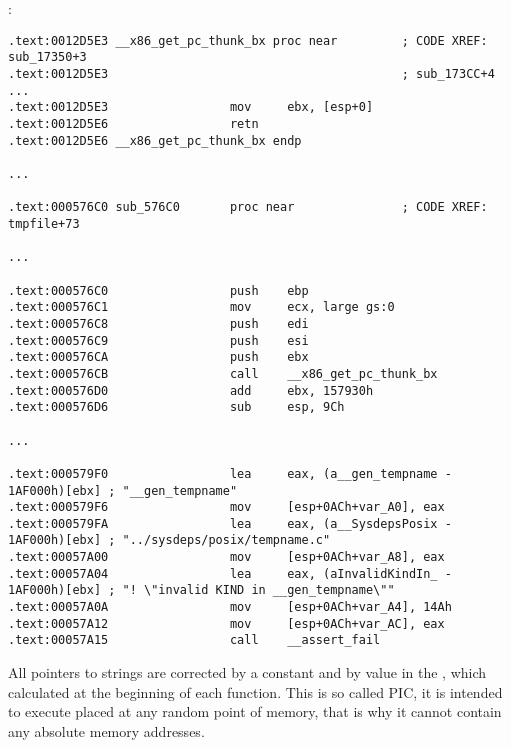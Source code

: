 \section{\CapitalPICcode}
\index{\PICcode}
\label{sec:PIC}

:

\begin{lstlisting}[caption=libc-2.17.so x86]
.text:0012D5E3 __x86_get_pc_thunk_bx proc near         ; CODE XREF: sub_17350+3
.text:0012D5E3                                         ; sub_173CC+4 ...
.text:0012D5E3                 mov     ebx, [esp+0]
.text:0012D5E6                 retn
.text:0012D5E6 __x86_get_pc_thunk_bx endp

...

.text:000576C0 sub_576C0       proc near               ; CODE XREF: tmpfile+73

...

.text:000576C0                 push    ebp
.text:000576C1                 mov     ecx, large gs:0
.text:000576C8                 push    edi
.text:000576C9                 push    esi
.text:000576CA                 push    ebx
.text:000576CB                 call    __x86_get_pc_thunk_bx
.text:000576D0                 add     ebx, 157930h
.text:000576D6                 sub     esp, 9Ch

...

.text:000579F0                 lea     eax, (a__gen_tempname - 1AF000h)[ebx] ; "__gen_tempname"
.text:000579F6                 mov     [esp+0ACh+var_A0], eax
.text:000579FA                 lea     eax, (a__SysdepsPosix - 1AF000h)[ebx] ; "../sysdeps/posix/tempname.c"
.text:00057A00                 mov     [esp+0ACh+var_A8], eax
.text:00057A04                 lea     eax, (aInvalidKindIn_ - 1AF000h)[ebx] ; "! \"invalid KIND in __gen_tempname\""
.text:00057A0A                 mov     [esp+0ACh+var_A4], 14Ah
.text:00057A12                 mov     [esp+0ACh+var_AC], eax
.text:00057A15                 call    __assert_fail
\end{lstlisting}

{All pointers to strings are corrected by a constant and by value in the \EBX,
which calculated at the beginning of each function.}
{This is so called \ac{PIC}, it is intended to execute placed at any random point of memory, that is why it cannot contain any absolute memory addresses}.

